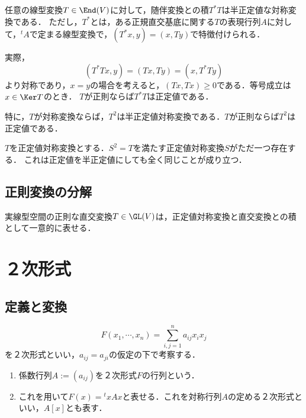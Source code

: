 \documentclass[uplatex, dvipdfmx]{jsreport}
\begin{document}
\begin{example}
    任意の線型変換$T\in\End(V)$に対して，随伴変換との積$T^*T$は半正定値な対称変換である．
    ただし，$T^*$とは，ある正規直交基底に関する$T$の表現行列$A$に対して，${}^tA$で定まる線型変換で，$(T^*x,y)=(x,Ty)$で特徴付けられる．

    実際，
    \[(T^*Tx,y)=(Tx,Ty)=(x,T^*Ty)\]
    より対称であり，$x=y$の場合を考えると，$(Tx,Tx)\ge 0$である．等号成立は$x\in\Ker T$のとき．
    $T$が正則ならば$T^*T$は正定値である．

    特に，$T$が対称変換ならば，$T^2$は半正定値対称変換である．$T$が正則ならば$T^2$は正定値である．
\end{example}

\begin{proposition}
    $T$を正定値対称変換とする．$S^2=T$を満たす正定値対称変換$S$がただ一つ存在する．
    これは正定値を半正定値にしても全く同じことが成り立つ．
\end{proposition}

\subsection{正則変換の分解}

\begin{tcolorbox}[colframe=ForestGreen, colback=ForestGreen!10!white,breakable,colbacktitle=ForestGreen!40!white,coltitle=black,fonttitle=\bfseries\sffamily,
title=]
    実線型空間の正則な直交変換$T\in\GL(V)$は，正定値対称変換と直交変換との積として一意的に表せる．
\end{tcolorbox}

\section{２次形式}

\subsection{定義と変換}

\begin{definition}
    \[F(x_1,\cdots,x_n)=\sum^n_{i,j=1}a_{ij}x_ix_j\]
    を２次形式といい，$a_{ij}=a_{ji}$の仮定の下で考察する．
    \begin{enumerate}
        \item 係数行列$A:=(a_{ij})$を２次形式$F$の行列という．
        \item これを用いて$F(x)={}^t\!xAx$と表せる．これを対称行列$A$の定める２次形式といい，$A[x]$とも表す．
    \end{enumerate}
\end{definition}
\end{document}
